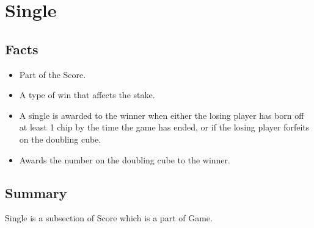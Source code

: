 \section{Single}

\subsection{Facts}
\begin{itemize} [itemsep=2pt,parsep=2pt]
    \item Part of the Score.
    \item A type of win that affects the stake.
    \item A single is awarded to the winner when either the losing player has born off at least 1 chip by the time the game has ended, or if the losing player forfeits on the doubling cube.
    \item Awards the number on the doubling cube to the winner.
\end{itemize}


\subsection{Summary}
Single is a subsection of Score which is a part of Game.

